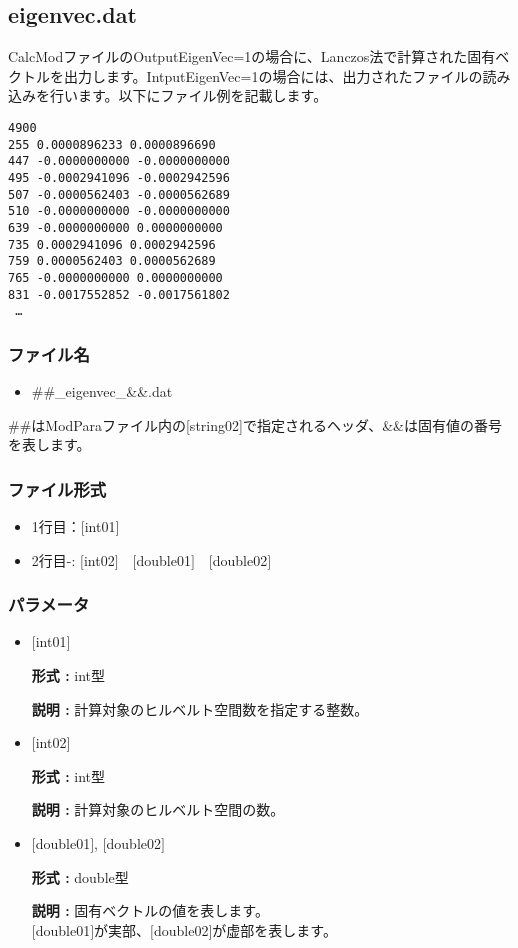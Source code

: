 \newpage
\subsection{eigenvec.dat}
\label{Subsec:eigenvec}
CalcModファイルのOutputEigenVec=1の場合に、Lanczos法で計算された固有ベクトルを出力します。IntputEigenVec=1の場合には、出力されたファイルの読み込みを行います。以下にファイル例を記載します。

\begin{minipage}{15cm}
\begin{screen}
\begin{verbatim}
4900 
255 0.0000896233 0.0000896690
447 -0.0000000000 -0.0000000000
495 -0.0002941096 -0.0002942596
507 -0.0000562403 -0.0000562689
510 -0.0000000000 -0.0000000000
639 -0.0000000000 0.0000000000
735 0.0002941096 0.0002942596
759 0.0000562403 0.0000562689
765 -0.0000000000 0.0000000000
831 -0.0017552852 -0.0017561802
 …
\end{verbatim}
\end{screen}
\end{minipage}

\subsubsection{ファイル名}
\begin{itemize}
   \item{\#\#\_eigenvec\_{\&\&}.dat}
\end{itemize}
  \#\#はModParaファイル内の[string02]で指定されるヘッダ、\&\&は固有値の番号を表します。

\subsubsection{ファイル形式}
 \begin{itemize}
   \item  1行目：$[$int01$]$
   \item  2行目-: $[$int02$]$~~$[$double01$]$~~$[$double02$]$
  \end{itemize}
\subsubsection{パラメータ}
 \begin{itemize}

  \item  $[$int01$]$

 {\bf 形式 :} int型

{\bf 説明 :} 計算対象のヒルベルト空間数を指定する整数。
 
  \item  $[$int02$]$

 {\bf 形式 :} int型 

{\bf 説明 :} 計算対象のヒルベルト空間の数。

 \item  $[$double01$]$, $[$double02$]$

 {\bf 形式 :} double型 

{\bf 説明 :} 固有ベクトルの値を表します。\\
$[$double01$]$が実部、$[$double02$]$が虚部を表します。\\
\end{itemize}

